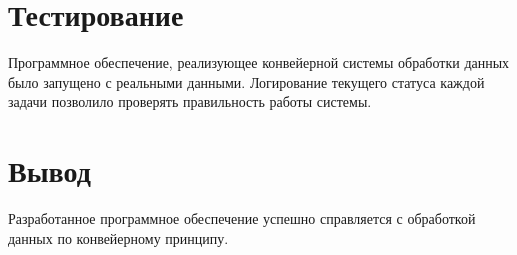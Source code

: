 \section{Тестирование}
Программное обеспечение, реализующее конвейерной системы обработки данных было запущено с реальными данными. Логирование текущего статуса каждой задачи позволило проверять правильность работы системы.

\section{Вывод}
Разработанное программное обеспечение успешно справляется с обработкой данных по конвейерному принципу.
